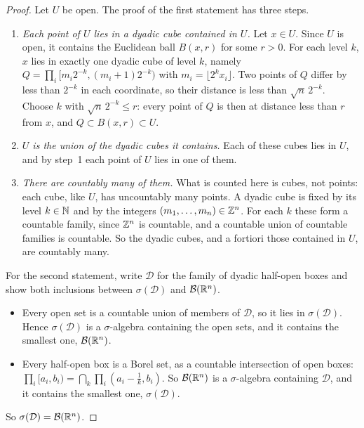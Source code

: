 \begin{notechapter}
\begin{proof}
Let $U$ be open. The proof of the first statement has three steps.
\begin{enumerate}[nosep]
  \item \emph{Each point of $U$ lies in a dyadic cube contained in $U$.}
        Let $x\in U$. Since $U$ is open, it contains the Euclidean ball
        $B(x, r)$ for some $r > 0$. For each level $k$, $x$ lies in
        exactly one dyadic cube of level $k$, namely
        $Q = \prod_i[m_i2^{-k}, (m_i + 1)2^{-k})$ with
        $m_i = \lfloor2^kx_i\rfloor$. Two points of $Q$ differ by less
        than $2^{-k}$ in each coordinate, so their distance is less than
        $\sqrt n\,2^{-k}$. Choose $k$ with $\sqrt n\,2^{-k}\leq r$: every
        point of $Q$ is then at distance less than $r$ from $x$, and
        $Q\subset B(x, r)\subset U$.
  \item \emph{$U$ is the union of the dyadic cubes it contains.} Each of
        these cubes lies in $U$, and by step~1 each point of $U$ lies in
        one of them.
  \item \emph{There are countably many of them.} What is counted here is
        cubes, not points: each cube, like $U$, has uncountably many
        points. A dyadic cube is fixed by its level $k\in\mathbb{N}$ and by the
        integers $(m_1, \dots, m_n)\in\mathbb{Z}^n$. For each $k$ these form a
        countable family, since $\mathbb{Z}^n$ is countable, and a countable
        union of countable families is countable. So the dyadic cubes,
        and a fortiori those contained in $U$, are countably many.
\end{enumerate}
For the second statement, write $\mathcal D$ for the family of dyadic
half-open boxes and show both inclusions between $\sigma(\mathcal D)$
and $\mathcal B(\mathbb{R}^n)$.
\begin{itemize}[nosep]
  \item Every open set is a countable union of members of $\mathcal D$,
        so it lies in $\sigma(\mathcal D)$. Hence $\sigma(\mathcal D)$
        is a $\sigma$-algebra containing the open sets, and it contains
        the smallest one, $\mathcal B(\mathbb{R}^n)$.
  \item Every half-open box is a Borel set, as a countable intersection
        of open boxes:
        $\prod_i[a_i, b_i) = \bigcap_k\prod_i(a_i - \frac1k, b_i)$. So
        $\mathcal B(\mathbb{R}^n)$ is a $\sigma$-algebra containing $\mathcal D$,
        and it contains the smallest one, $\sigma(\mathcal D)$.
\end{itemize}
So $\sigma(\mathcal D) = \mathcal B(\mathbb{R}^n)$.
\end{proof}


\end{notechapter}
